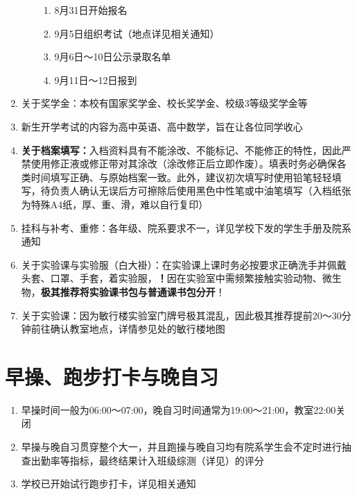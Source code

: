 \begin{enumerate}
\begin{enumerate}
\begin{enumerate}
                        \item 8月31日开始报名
                        \item 9月5日组织考试（地点详见相关通知）
                        \item 9月6日～10日公示录取名单\footnotemark
                        \item 9月11日～12日报到
                    \end{enumerate}
          \end{enumerate}
    \item 关于奖学金\footnotemark：本校有国家奖学金、校长奖学金、校级3等级奖学金等
    \item 新生开学考试\footnotemark 的内容为高中英语、高中数学，旨在让各位同学收心
    \item \textbf{关于档案填写：}入档资料具有不能涂改、不能标记、不能修正的特性，因此严禁使用修正液或修正带对其涂改（涂改修正后立即作废）。填表时务必确保各类时间填写正确、与原始档案一致。此外，建议初次填写时使用铅笔轻轻填写，待负责人确认无误后方可擦除后使用黑色中性笔或中油笔填写（入档纸张为特殊A4纸，厚、重、滑，难以自行复印）
    \item 挂科与补考、重修：各年级、院系要求不一，详见学校下发的学生手册及院系通知
    \item 关于实验课与实验服（白大褂）：在实验课上课时务必按要求正确洗手并佩戴头套、口罩、手套，着实验服，\textbf{！}因在实验室中需频繁接触实验动物、微生物，\textbf{极其推荐将实验课书包与普通课书包分开}！
          \label{schoolbag}
    \item 关于实验课：因为敏行楼实验室门牌号极其混乱，因此极其推荐提前20～30分钟前往确认教室地点，详情参见处的敏行楼地图
\end{enumerate}

\section[早操、跑步打卡与晚自习]{早操、跑步打卡与晚自习}
\begin{enumerate}
    \item 早操时间一般为06:00～07:00，晚自习时间通常为19:00～21:00，教室22:00关闭
    \item 早操与晚自习贯穿整个大一\footnotemark，并且跑操与晚自习均有院系学生会不定时进行抽查出勤率等指标，最终结果计入班级综测（详见）的评分
    \item 学校已开始试行跑步打卡，详见相关通知
\end{enumerate}

